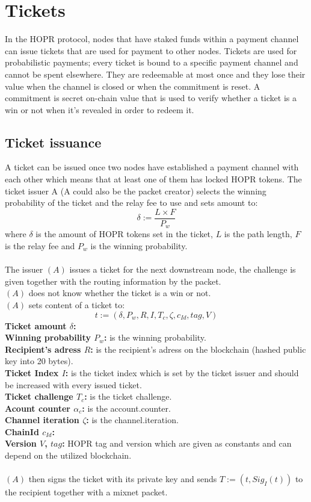 \section{Tickets}
In the HOPR protocol, nodes that have staked funds within a payment channel can issue tickets that are used for payment to other nodes. 
Tickets are used for probabilistic payments; every ticket is bound to a specific payment channel and cannot be spent elsewhere. 
They are redeemable at most once and they lose their value when the channel is closed or when the commitment is reset. A commitment is secret on-chain value that is used to verify whether a ticket is a win or not when it's revealed in order to redeem it.
\subsection{Ticket issuance}
A ticket can be issued once two nodes have established a payment channel with each other which means that at least one of them has locked HOPR tokens.
\newline The ticket issuer A (A could also be the packet creator) selects the winning probability of the ticket and the relay fee to use and sets amount to:
$$\delta:=\dfrac{L\times F}{P_w}$$
where $\delta$ is the amount of HOPR tokens set in the ticket, $L$ is the path length, $F$ is the relay fee and $P_w$ is the winning probability.
\\~\\The issuer $(A)$ issues a ticket for the next downstream node, 
the challenge is given together with the routing information by the packet. 
\\$(A)$ does not know whether the ticket is a win or not.
\\$(A)$ sets content of a ticket to: $$t:=(\delta,P_w,R,I,T_c,\zeta,c_{Id},tag,V)$$ 
\textbf{Ticket amount $\delta$:}
\\\textbf{Winning probability $P_w$:} is the winning probability.
\\\textbf{Recipient's adress $R$:} is the recipient's adress on the blockchain (hashed public key into 20 bytes).
\\\textbf{Ticket Index $I$:} is the ticket index which is set by the ticket issuer and should be increased with every issued ticket.
\\\textbf{Ticket challenge $T_c$:}  is the ticket challenge.
\\\textbf{Acount counter $\alpha_c$:} is the account.counter.
\\\textbf{Channel iteration $\zeta$:} is the channel.iteration.
\\\textbf{ChainId $c_{Id}$:}
\\\textbf{Version $V$, $tag$:} HOPR tag and version which are given as constants and can depend on the utilized blockchain.
\\~\\$(A)$ then signs the ticket with its private key and sends $T:= (t, Sig_I(t))$ to the recipient together with a mixnet packet.


